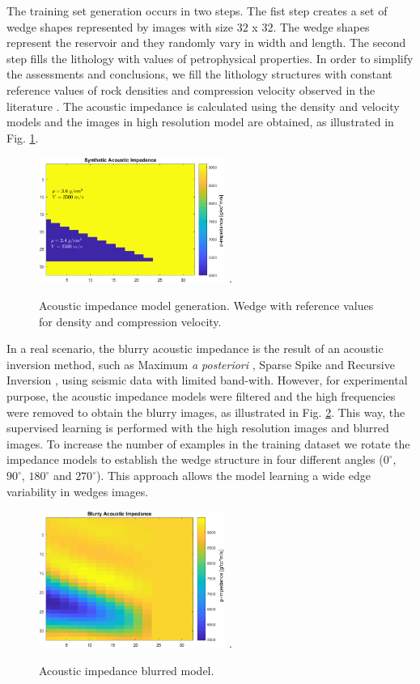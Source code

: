 \documentclass[conference]{IEEEtran}
\begin{document}
The training set generation occurs in two steps.
The fist step creates a set of wedge shapes represented
by images with size $32$ x $32$. The wedge shapes represent the reservoir and they
randomly vary in width and length. The second step fills the lithology with values of petrophysical properties.
In order to simplify the assessments and conclusions, we fill the lithology structures with constant
reference values of rock densities and compression velocity observed in the literature \cite{Mavko2009}.
The acoustic impedance is calculated using the density and velocity models and the images in high
resolution model are obtained, as illustrated in  Fig. \ref{fig_lithology}.
\begin{figure}[!t]
\centering
\includegraphics[width=2.4in]{Figs/image_cunha}
\DeclareGraphicsExtensions.
\caption{Acoustic impedance model generation. Wedge with reference values for density and compression velocity.}
\label{fig_lithology}
\end{figure}

In a real scenario, the blurry acoustic impedance is the
result of an acoustic inversion method, such as Maximum \textit{a posteriori} \cite{Buland2003,Figueiredo2012}, Sparse Spike \cite{Debeye1990} 
and Recursive Inversion \cite{Chopra2001}, using seismic data with limited band-with.
However, for experimental purpose, the acoustic impedance models were filtered
and the high frequencies were removed to obtain the blurry images, as illustrated in Fig. \ref{fig_blur}.
This way, the supervised learning is performed with the high resolution images and blurred images.
To increase the number of examples in the training dataset we rotate
the impedance models to establish the wedge structure in four different angles
($0^{\circ}$, $90^{\circ}$, $180^{\circ}$ and $270^{\circ}$).
This approach allows the model learning a wide edge variability in wedges images.
\begin{figure}[!t]
\centering
\includegraphics[width=2.4in]{Figs/image_cunha_blurry}
\DeclareGraphicsExtensions.
\caption{Acoustic impedance blurred model.}
\label{fig_blur}
\end{figure}
\end{document}
